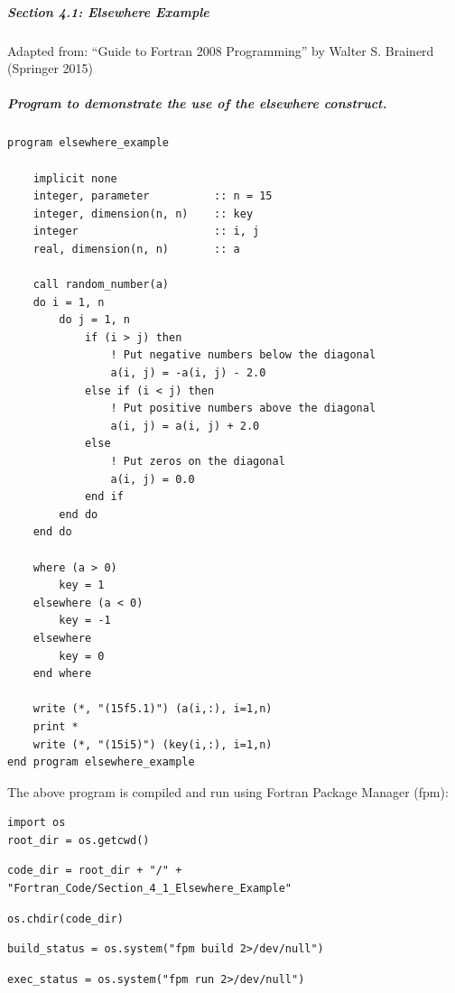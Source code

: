 \subparagraph{Section 4.1: Elsewhere Example}

Adapted from: ``Guide to Fortran 2008 Programming'' by Walter S. Brainerd (Springer 2015)

\subparagraph{Program to demonstrate the use of the \textit{elsewhere} construct.}

\begin{verbatim}
program elsewhere_example

    implicit none
    integer, parameter          :: n = 15
    integer, dimension(n, n)    :: key
    integer                     :: i, j
    real, dimension(n, n)       :: a

    call random_number(a)
    do i = 1, n
        do j = 1, n
            if (i > j) then
                ! Put negative numbers below the diagonal
                a(i, j) = -a(i, j) - 2.0
            else if (i < j) then
                ! Put positive numbers above the diagonal
                a(i, j) = a(i, j) + 2.0
            else
                ! Put zeros on the diagonal
                a(i, j) = 0.0
            end if
        end do
    end do

    where (a > 0)
        key = 1
    elsewhere (a < 0)
        key = -1
    elsewhere
        key = 0
    end where

    write (*, "(15f5.1)") (a(i,:), i=1,n)
    print *
    write (*, "(15i5)") (key(i,:), i=1,n)
end program elsewhere_example
\end{verbatim}

The above program is compiled and run using Fortran Package Manager (fpm):

\begin{verbatim}
import os
root_dir = os.getcwd()
\end{verbatim}

\begin{verbatim}
code_dir = root_dir + "/" + "Fortran_Code/Section_4_1_Elsewhere_Example"
\end{verbatim}

\begin{verbatim}
os.chdir(code_dir)
\end{verbatim}

\begin{verbatim}
build_status = os.system("fpm build 2>/dev/null")
\end{verbatim}

\begin{verbatim}
exec_status = os.system("fpm run 2>/dev/null")
\end{verbatim}

